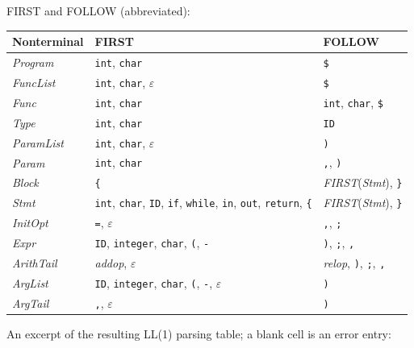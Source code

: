 \documentclass[11pt]{article}
\begin{document}
\noindent
FIRST and FOLLOW (abbreviated):

\begin{center}
\begin{tabular}{@{}lll@{}}
\toprule
\textbf{Nonterminal} & \textbf{FIRST} & \textbf{FOLLOW}\\
\midrule
\textit{Program}    & \texttt{int}, \texttt{char}                        & \texttt{\$}\\
\textit{FuncList}   & \texttt{int}, \texttt{char}, $\varepsilon$         & \texttt{\$}\\
\textit{Func}       & \texttt{int}, \texttt{char}                        & \texttt{int}, \texttt{char}, \texttt{\$}\\
\textit{Type}       & \texttt{int}, \texttt{char}                        & \texttt{ID}\\
\textit{ParamList}  & \texttt{int}, \texttt{char}, $\varepsilon$         & \texttt{)}\\
\textit{Param}      & \texttt{int}, \texttt{char}                        & \texttt{,}, \texttt{)}\\
\textit{Block}      & \texttt{\{}                                        & \textit{FIRST}(\textit{Stmt}), \texttt{\}}\\
\textit{Stmt}       & \texttt{int}, \texttt{char}, \texttt{ID}, \texttt{if},
                      \texttt{while}, \texttt{in}, \texttt{out}, \texttt{return}, \texttt{\{} &
                      \textit{FIRST}(\textit{Stmt}), \texttt{\}}\\
\textit{InitOpt}    & \texttt{=}, $\varepsilon$                          & \texttt{,}, \texttt{;}\\
\textit{Expr}       & \texttt{ID}, \texttt{integer}, \texttt{char}, \texttt{(}, \texttt{-} & \texttt{)}, \texttt{;}, \texttt{,}\\
\textit{ArithTail}  & \textit{addop}, $\varepsilon$                      & \textit{relop}, \texttt{)}, \texttt{;}, \texttt{,}\\
\textit{ArgList}    & \texttt{ID}, \texttt{integer}, \texttt{char}, \texttt{(}, \texttt{-}, $\varepsilon$ & \texttt{)}\\
\textit{ArgTail}    & \texttt{,}, $\varepsilon$                          & \texttt{)}\\
\bottomrule
\end{tabular}
\end{center}

\noindent
An excerpt of the resulting LL(1) parsing table; a blank cell is an error
entry:
\end{document}
